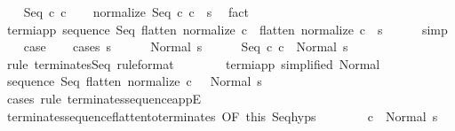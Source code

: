 \begin{isabellebody}
\isamarkupfalse%
\isanewline
\ \ \isamarkupfalse%
\ {\isacharparenleft}Seq\ c{}\ c{}{\isacharparenright}\isanewline
\ \ \isamarkupfalse%
\ {\isachardoublequoteopen}{\isasymGamma}{\isasymturnstile}normalize\ {\isacharparenleft}Seq\ c{}\ c{}{\isacharparenright}\ {\isasymdown}\ s{\isachardoublequoteclose}\ \isamarkupfalse%
\ fact\isanewline
\ \ \isamarkupfalse%
\ termi{\isacharunderscore}app{\isacharcolon}\ {\isachardoublequoteopen}{\isasymGamma}{\isasymturnstile}sequence\ Seq\ {\isacharparenleft}flatten\ {\isacharparenleft}normalize\ c{}{\isacharparenright}\ {\isacharat}\ flatten\ {\isacharparenleft}normalize\ c{}{\isacharparenright}{\isacharparenright}\ {\isasymdown}\ s{\isachardoublequoteclose}\isanewline
\ \ \ \ \isamarkupfalse%
\ simp\isanewline
\ \ \isamarkupfalse%
\ {\isacharquery}case\isanewline
\ \ \isamarkupfalse%
\ {\isacharparenleft}cases\ s{\isacharparenright}\isanewline
\ \ \ \ \isamarkupfalse%
\ {\isacharparenleft}Normal\ s{\isacharprime}{\isacharparenright}\isanewline
\ \ \ \ \isamarkupfalse%
\ {\isachardoublequoteopen}{\isasymGamma}{\isasymturnstile}Seq\ c{}\ c{}\ {\isasymdown}\ Normal\ s{\isacharprime}{\isachardoublequoteclose}\isanewline
\ \ \ \ \isamarkupfalse%
\ {\isacharparenleft}rule\ terminates{\isachardot}Seq\ {\isacharbrackleft}rule{\isacharunderscore}format{\isacharbrackright}{\isacharparenright}\isanewline
\ \ \ \ \ \ \isamarkupfalse%
\ termi{\isacharunderscore}app\ {\isacharbrackleft}simplified\ Normal{\isacharbrackright}\isanewline
\ \ \ \ \ \ \isamarkupfalse%
\ {\isachardoublequoteopen}{\isasymGamma}{\isasymturnstile}sequence\ Seq\ {\isacharparenleft}flatten\ {\isacharparenleft}normalize\ c{}{\isacharparenright}{\isacharparenright}\ \ {\isasymdown}\ Normal\ s{\isacharprime}{\isachardoublequoteclose}\isanewline
\ \ \ \ \ \ \ \ \isamarkupfalse%
\ {\isacharparenleft}cases\ rule{\isacharcolon}\ terminates{\isacharunderscore}sequence{\isacharunderscore}appE{\isacharparenright}\isanewline
\ \ \ \ \ \ \isamarkupfalse%
\ terminates{\isacharunderscore}sequence{\isacharunderscore}flatten{\isacharunderscore}to{\isacharunderscore}terminates\ {\isacharbrackleft}OF\ this{\isacharbrackright}\ Seq{\isachardot}hyps\isanewline
\ \ \ \ \ \ \isamarkupfalse%
\ {\isachardoublequoteopen}{\isasymGamma}{\isasymturnstile}c{}\ {\isasymdown}\ Normal\ s{\isacharprime}{\isachardoublequoteclose}\ \isanewline

\end{isabellebody}
